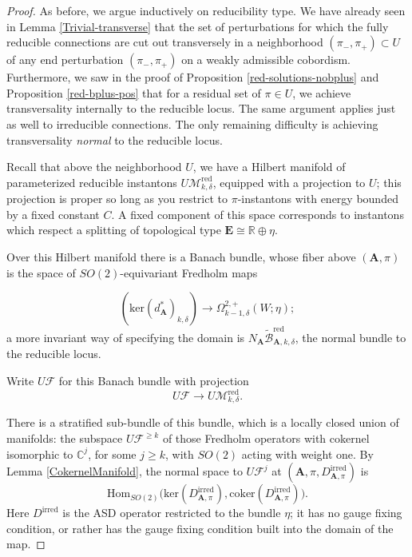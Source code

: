 \documentclass{memo-l}
\theoremstyle{definition}
\theoremstyle{remark}
\numberwithin{section}{chapter}
\numberwithin{equation}{chapter}
\begin{document}
\begin{proof}As before, we argue inductively on reducibility type. We have already seen in Lemma \ref{Trivial-transverse} that the set of perturbations for which the fully reducible connections are cut out transversely in a neighborhood $(\pi_-,\pi_+) \subset U$ of any end perturbation $(\pi_-, \pi_+)$ on a weakly admissible cobordism. Furthermore, we saw in the proof of Proposition \ref{red-solutions-nobplus} and Proposition \ref{red-bplus-pos} that for a residual set of $\pi \in U$, we achieve transversality internally to the reducible locus. The same argument applies just as well to irreducible connections. The only remaining difficulty is achieving transversality \emph{normal} to the reducible locus.

Recall that above the neighborhood $U$, we have a Hilbert manifold of parameterized reducible instantons $U\mathcal M^{\text{red}}_{k,\delta}$, equipped with a projection to $U$; this projection is proper so long as you restrict to $\pi$-instantons with energy bounded by a fixed constant $C$. A fixed component of this space corresponds to instantons which respect a splitting of topological type $\mathbf{E} \cong \mathbb R \oplus \eta$.

Over this Hilbert manifold there is a Banach bundle, whose fiber above $(\mathbf{A},\pi)$ is the space of $SO(2)$-equivariant Fredholm maps

$$\left(\text{ker}(d_{\mathbf{A}}^*)_{k,\delta}\right) \to \Omega^{2,+}_{k-1,\delta}(W;\eta);$$
a more invariant way of specifying the domain is $N_{\mathbf{A}} \widetilde{\mathcal B}^{\text{red}}_{\mathbf{A},k,\delta}$, the normal bundle to the reducible locus.

Write $U\mathcal F$ for this Banach bundle with projection $$U \mathcal F \to U \mathcal M^{\text{red}}_{k,\delta}.$$

There is a stratified sub-bundle of this bundle, which is a locally closed union of manifolds: the subspace $U \mathcal F^{\geq k}$ of those Fredholm operators with cokernel isomorphic to $\mathbb C^j$, for some $j \geq k$, with $SO(2)$ acting with weight one. By Lemma \ref{CokernelManifold}, the normal space to $U \mathcal F^j$ at $(\mathbf{A},\pi, D^{\text{irred}}_{\mathbf{A},\pi})$ is
$$\text{Hom}_{SO(2)}\big(\text{ker}(D^{\text{irred}}_{\mathbf{A},\pi}), \text{coker}(D^{\text{irred}}_{\mathbf{A},\pi})\big).$$
Here $D^{\text{irred}}$ is the ASD operator restricted to the bundle $\eta$; it has no gauge fixing condition, or rather has the gauge fixing condition built into the domain of the map.


\end{proof}
\end{document}
